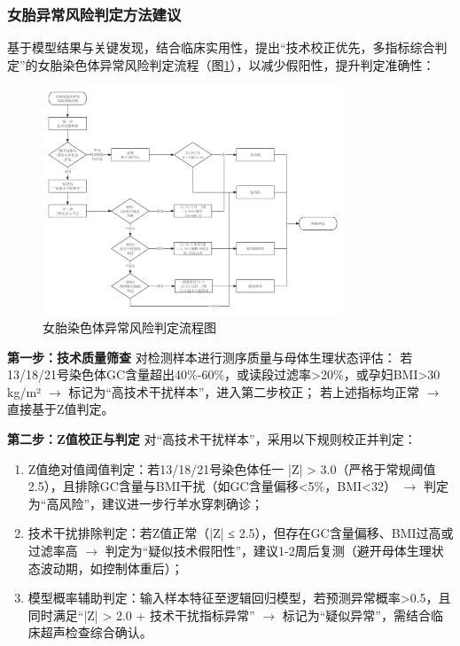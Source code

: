 \documentclass[withoutpreface,bwprint]{cumcmthesis} %
\begin{document}
\subsubsection{女胎异常风险判定方法建议}
基于模型结果与关键发现，结合临床实用性，提出“技术校正优先，多指标综合判定”的女胎染色体异常风险判定流程（图\ref{fig:q4-flow-chart}），以减少假阳性，提升判定准确性：
\begin{figure}[H]
    \centering
    \includegraphics[width=0.8\textwidth]{../figure/q4_flow_chart.png}
    \caption{女胎染色体异常风险判定流程图}
    \label{fig:q4-flow-chart}
\end{figure}

\textbf{第一步：技术质量筛查}
对检测样本进行测序质量与母体生理状态评估：  
若13/18/21号染色体GC含量超出40\%-60\%，或读段过滤率>20\%，或孕妇BMI>30 kg/m² $\to$ 标记为“高技术干扰样本”，进入第二步校正；  
若上述指标均正常 $\to$ 直接基于Z值判定。

\textbf{第二步：Z值校正与判定}
对“高技术干扰样本”，采用以下规则校正并判定：
\begin{enumerate}
    \item Z值绝对值阈值判定：若13/18/21号染色体任一 |Z| > 3.0（严格于常规阈值2.5），且排除GC含量与BMI干扰（如GC含量偏移<5\%，BMI<32） $\to$ 判定为“高风险”，建议进一步行羊水穿刺确诊；
    \item 技术干扰排除判定：若Z值正常（|Z| ≤ 2.5），但存在GC含量偏移、BMI过高或过滤率高 $\to$ 判定为“疑似技术假阳性”，建议1-2周后复测（避开母体生理状态波动期，如控制体重后）；
    \item 模型概率辅助判定：输入样本特征至逻辑回归模型，若预测异常概率>0.5，且同时满足“|Z| > 2.0 + 技术干扰指标异常” $\to$ 标记为“疑似异常”，需结合临床超声检查综合确认。
\end{enumerate}
\end{document}
